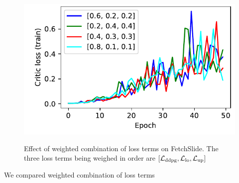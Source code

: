 \begin{figure}
  \includegraphics[width=\frac\columnwidth]{./media/res/04a8fc6-814a3d24-FetchSlide-v1-fwrl-future/train/critic_loss.pdf}%
  \label{fig:loss-term-weights}%
  \caption{Effect of weighted combination of loss terms on FetchSlide. The three
  loss terms being weighed in order are $[\mathcal{L}_{\text{ddpg}}, \mathcal{L}_{\text{lo}}, \mathcal{L}_{\text{up}}]$}%
\end{figure}%
% 
We compared weighted combination of loss terms


%
%
%
%
%
